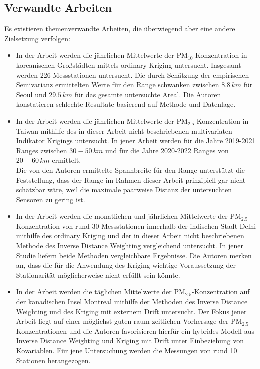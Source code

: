 
\subsection{Verwandte Arbeiten}
\label{KapitelDatenauswertung_VerwandteArbeiten}
Es existieren themenverwandte Arbeiten, die überwiegend aber
eine andere Zielsetzung verfolgen:
\begin{itemize}[topsep=2pt,parsep=1pt,itemsep=0.5pt]
\item[$\circ$] In der Arbeit \cite{Kim2014} werden
die jährlichen Mittelwerte der 
$\mathrm{PM}_{10}$-Konzen\-tra\-tion in koreanischen 
Großstädten mittels ordinary Kriging untersucht. 
Insgesamt werden 226 Messstationen untersucht. Die 
durch Schätzung der empirischen Semivarianz ermittelten
Werte für den Range schwanken zwischen  $8.8\,km$ für Seoul
und $29.5\,km$ für das gesamte untersuchte Areal.
Die Autoren konstatieren schlechte Resultate basierend auf 
Methode und Datenlage.
\item[$\circ$] In der Arbeit \cite{Jang2023} werden
die jährlichen Mittelwerte der 
$\mathrm{PM}_{2.5}$-Konzentration in Taiwan mithilfe des
in dieser Arbeit nicht beschriebenen multivariaten 
Indikator Krigings untersucht. 
In jener Arbeit werden für die Jahre 2019-2021 Ranges
zwischen $30-50\,km$ und für die Jahre 2020-2022 
Ranges von $20-60\,km$ ermittelt.\\
Die von den Autoren ermittelte Spannbreite für den Range unterstützt die 
Feststellung, dass der Range im Rahmen dieser Arbeit prinzipiell gar 
nicht schätzbar wäre, weil die maximale paarweise Distanz der 
untersuchten Sensoren zu gering ist.
\item[$\circ$] In der Arbeit \cite{Shukla2020} werden 
die monatlichen und jährlichen Mittelwerte der
$\mathrm{PM}_{2.5}$-Konzentration von rund 30 Messstationen
innerhalb der indischen Stadt Delhi mithilfe des ordinary
Kriging und der in dieser Arbeit nicht beschriebenen 
Methode des Inverse Distance Weighting vergleichend 
untersucht. In jener Studie liefern beide Methoden 
vergleichbare Ergebnisse. Die Autoren merken an, dass
die für die Anwendung des Kriging wichtige 
Voraussetzung der Stationarität möglicherweise 
nicht erfüllt sein könnte.  
\item[$\circ$] In der Arbeit \cite{Ramos2016} werden die
täglichen Mittelwerte der $\mathrm{PM}_{2.5}$-Konzen\-tra\-tion
auf der kanadischen Insel Montreal mithilfe 
der Methoden des Inverse Distance Weighting und 
des Kriging mit externem Drift untersucht. Der Fokus
jener Arbeit liegt auf einer möglichst guten 
raum-zeitlichen Vorhersage der 
$\mathrm{PM}_{2.5}$-Konzentra\-ti\-onen und die Autoren
favorisieren hierfür ein hybrides Modell aus 
Inverse Distance Weighting und Kriging mit Drift unter Einbeziehung von Kovariablen. 
Für jene Untersuchung werden die Messungen von rund 
10 Stationen herangezogen.
\end{itemize}
